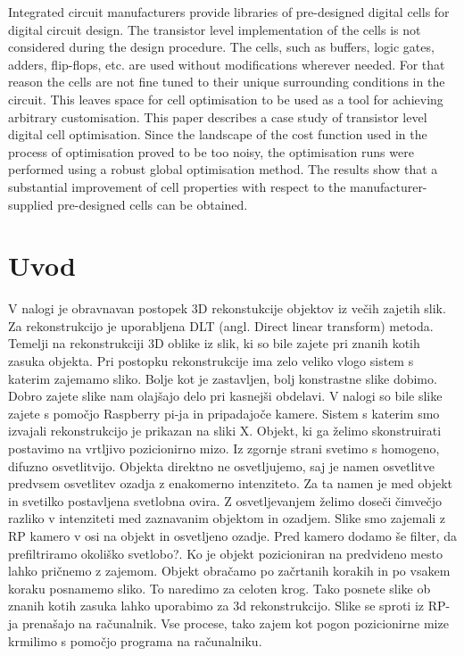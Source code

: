 \documentclass[journal,a4paper,twoside]{sty/IEEEtran}
\begin{document}
{Integrated circuit manufacturers provide libraries of pre-designed digital cells for digital circuit design. The transistor level implementation of the cells is not considered during the design procedure. The cells, such as buffers, logic gates, adders, flip-flops, etc. are used without modifications wherever needed. For that reason the cells are not fine tuned to their unique surrounding conditions in the circuit. This leaves space for cell optimisation to be used as a tool for achieving arbitrary customisation. This paper describes a case study of transistor level digital cell optimisation. Since the landscape of the cost function used in the process of optimisation proved to be too noisy, the optimisation runs were performed using a robust global optimisation method. The results show that a substantial improvement of cell properties with respect to the manufacturer-supplied pre-designed cells can be obtained.}

\section{Uvod}

V nalogi je obravnavan postopek 3D rekonstukcije objektov iz večih zajetih slik. Za rekonstrukcijo je uporabljena DLT (angl. Direct linear transform) metoda. Temelji na rekonstrukciji 3D oblike iz slik, ki so bile zajete pri znanih kotih zasuka objekta. Pri postopku rekonstrukcije ima zelo veliko vlogo sistem s katerim zajemamo sliko. Bolje kot je zastavljen, bolj konstrastne slike dobimo. Dobro zajete slike nam olajšajo delo pri kasnejši obdelavi. V nalogi so bile slike zajete s pomočjo Raspberry pi-ja in pripadajoče kamere. 
Sistem s katerim smo izvajali rekonstrukcijo je prikazan na sliki X. Objekt, ki ga želimo skonstruirati postavimo na vrtljivo pozicionirno mizo. Iz zgornje strani svetimo s homogeno, difuzno osvetlitvijo. Objekta direktno ne osvetljujemo, saj je namen osvetlitve predvsem osvetlitev ozadja z enakomerno intenziteto. Za ta namen je med objekt in svetilko postavljena svetlobna ovira. Z osvetljevanjem želimo doseči čimvečjo razliko v intenziteti med zaznavanim objektom in ozadjem.
Slike smo zajemali z RP kamero v osi na objekt in osvetljeno ozadje. Pred kamero dodamo še filter, da prefiltriramo okoliško svetlobo?. Ko je objekt pozicioniran na predvideno mesto lahko pričnemo z zajemom. Objekt obračamo po začrtanih korakih in po vsakem koraku posnamemo sliko. To naredimo za celoten krog. Tako posnete slike ob znanih kotih zasuka lahko uporabimo za 3d rekonstrukcijo. Slike se sproti iz RP-ja prenašajo na računalnik. Vse procese, tako zajem kot pogon pozicionirne mize krmilimo s pomočjo programa na računalniku.
\end{document}
